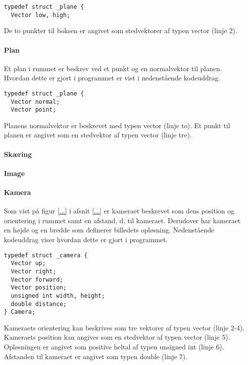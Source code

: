 \begin{lstlisting}[style=Cstyle, caption=Struct til bounding boxes]
typedef struct _plane {
  Vector low, high;
\end{lstlisting}

De to punkter til boksen er angivet som stedvektorer af typen vector (linje 2).

\paragraph{Plan}
Et plan i rummet er beskrev ved et punkt og en normalvektor til planen. Hvordan dette er gjort i programmet er vist i nedenstående kodeuddrag. 

\begin{lstlisting}[style=Cstyle, caption=Struct til plan]
typedef struct _plane {
  Vector normal;
  Vector point;
\end{lstlisting}

Planens normalvektor er beskrevet med typen vector (linje to). Et punkt til planen er angivet som en stedvektor af typen vector (linje tre).

\paragraph{Skæring}


\paragraph{Image}

\paragraph{Kamera}
Som vist på figur \ref{...} i afsnit \ref{...} er kameraet beskrevet som dens position og orientering i rummet samt en afstand, d, til kameraet. Derudover har kameraet en højde og en bredde som definerer billedets opløsning. Nedenstående kodeuddrag viser hvordan dette er gjort i programmet.

\begin{lstlisting}[style=Cstyle, caption=Struct til kamera]
typedef struct _camera {
  Vector up;
  Vector right;
  Vector forward;
  Vector position;
  unsigned int width, height;
  double distance;
} Camera;
\end{lstlisting}

Kameraets orientering kan beskrives som tre vektorer af typen vector (linje 2-4). Kameraets position kan angives som en stedvektor af typen vector (linje 5). Opløsningen er angivet som positive heltal af typen unsigned int (linje 6). Afstanden til kameraet er angivet som typen double (linje 7).

